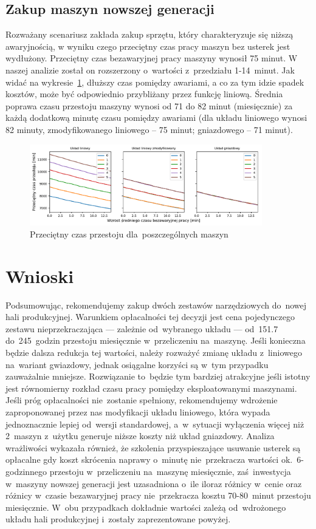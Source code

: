 \documentclass[12pt, a4paper, oneside]{mwart} %
\begin{document}
\subsection{Zakup maszyn nowszej generacji}
Rozważany scenariusz zakłada zakup sprzętu, który charakteryzuje się niższą awaryjnością, w wyniku czego przeciętny czas pracy maszyn bez usterek jest wydłużony. Przeciętny czas bezawaryjnej pracy maszyny wynosił 75 minut. W naszej analizie został on rozszerzony o~wartości z~przedziału 1-14~minut. Jak widać na wykresie~\ref{wyk_bezawaryjna_praca}, dłuższy czas pomiędzy awariami, a co za tym idzie spadek kosztów, może być odpowiednio przybliżany przez funkcję liniową. Średnia poprawa czasu przestoju maszyny wynosi od 71 do 82 minut (miesięcznie) za każdą dodatkową minutę czasu pomiędzy awariami (dla układu liniowego wynosi 82 minuty, zmodyfikowanego liniowego – 75 minut; gniazdowego – 71 minut).
\begin{figure}
\centering
\caption{Przeciętny czas przestoju dla~poszczególnych maszyn}
\label{wyk_bezawaryjna_praca}
\includegraphics[width = 0.9\textwidth]{wykresy/bezawaryjna_praca.pdf}
\end{figure}

\section{Wnioski}
Podsumowując, rekomendujemy zakup dwóch zestawów narzędziowych do~nowej hali produkcyjnej. Warunkiem opłacalności tej decyzji jest cena pojedynczego zestawu nieprzekraczająca --- zależnie od~wybranego układu --- od~151.7 do~245~godzin przestoju miesięcznie w~przeliczeniu na~maszynę. Jeśli konieczna będzie dalsza redukcja tej wartości, należy rozważyć zmianę układu z~liniowego na~wariant gwiazdowy, jednak osiągalne korzyści są w~tym przypadku zauważalnie mniejsze. Rozwiązanie to~będzie tym bardziej atrakcyjne jeśli istotny jest równomierny rozkład czasu pracy pomiędzy eksploatowanymi maszynami. Jeśli próg opłacalności nie~zostanie spełniony, rekomendujemy wdrożenie zaproponowanej przez nas modyfikacji układu liniowego, która wypada jednoznacznie lepiej od~wersji standardowej, a~w~sytuacji wyłączenia więcej niż 2~maszyn z~użytku generuje niższe koszty niż układ gniazdowy. Analiza wrażliwości wykazała również, że szkolenia przyspieszające usuwanie usterek są opłacalne gdy koszt skrócenia naprawy o~minutę nie~przekracza wartości ok.~6-godzinnego przestoju w~przeliczeniu na~maszynę miesięcznie, zaś~inwestycja w~maszyny nowszej generacji jest uzasadniona o~ile iloraz różnicy w~cenie oraz różnicy w~czasie bezawaryjnej pracy nie~przekracza kosztu 70-80~minut przestoju miesięcznie. W~obu przypadkach dokładnie wartości zależą od~wdrożonego układu hali produkcyjnej i~zostały zaprezentowane powyżej.
\end{document}
